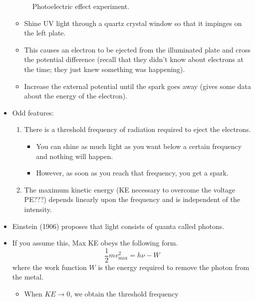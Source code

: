 \documentclass[../notes.tex]{subfiles}
\begin{document}
\begin{itemize}
\begin{figure}[h!]
        \caption{Photoelectric effect experiment.}
        \label{fig:PEeffectExp}
    \end{figure}
    \begin{itemize}
        \item Shine UV light through a quartz crystal window so that it impinges on the left plate.
        \item This causes an electron to be ejected from the illuminated plate and cross the potential difference (recall that they didn't know about electrons at the time; they just knew something was happening).
        \item Increase the external potential until the spark goes away (gives some data about the energy of the electron).
    \end{itemize}
    \item Odd features:
    \begin{enumerate}
        \item There is a threshold frequency of radiation required to eject the electrons.
        \begin{itemize}
            \item You can shine as much light as you want below a certain frequency and nothing will happen.
            \item However, as soon as you reach that frequency, you get a spark.
        \end{itemize}
        \item The maximum kinetic energy (KE necessary to overcome the voltage PE???) depends linearly upon the frequency and is independent of the intensity.
    \end{enumerate}
    \item Einstein (1906) proposes that light consists of quanta called photons.
    \item If you assume this, Max KE obeys the following form.
    \begin{equation*}
        \frac{1}{2}mv_\text{max}^2 = h\nu-W
    \end{equation*}
    where the work function $W$ is the energy required to remove the photon from the metal.
    \begin{itemize}
        \item When $KE\to 0$, we obtain the threshold frequency

\end{itemize}
\end{itemize}
\end{document}
